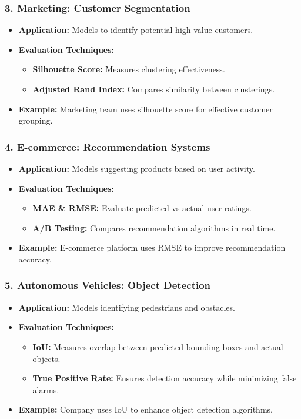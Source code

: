 \documentclass[aspectratio=169]{beamer}
\begin{document}
\begin{frame}[fragile]
    \frametitle{3. Marketing: Customer Segmentation}
    \begin{itemize}
        \item \textbf{Application:} Models to identify potential high-value customers.
        \item \textbf{Evaluation Techniques:}
        \begin{itemize}
            \item \textbf{Silhouette Score:} Measures clustering effectiveness.
            \item \textbf{Adjusted Rand Index:} Compares similarity between clusterings.
        \end{itemize}
        \item \textbf{Example:} Marketing team uses silhouette score for effective customer grouping.
    \end{itemize}
\end{frame}

\begin{frame}[fragile]
    \frametitle{4. E-commerce: Recommendation Systems}
    \begin{itemize}
        \item \textbf{Application:} Models suggesting products based on user activity.
        \item \textbf{Evaluation Techniques:}
        \begin{itemize}
            \item \textbf{MAE \& RMSE:} Evaluate predicted vs actual user ratings.
            \item \textbf{A/B Testing:} Compares recommendation algorithms in real time.
        \end{itemize}
        \item \textbf{Example:} E-commerce platform uses RMSE to improve recommendation accuracy.
    \end{itemize}
\end{frame}

\begin{frame}[fragile]
    \frametitle{5. Autonomous Vehicles: Object Detection}
    \begin{itemize}
        \item \textbf{Application:} Models identifying pedestrians and obstacles.
        \item \textbf{Evaluation Techniques:}
        \begin{itemize}
            \item \textbf{IoU:} Measures overlap between predicted bounding boxes and actual objects.
            \item \textbf{True Positive Rate:} Ensures detection accuracy while minimizing false alarms.
        \end{itemize}
        \item \textbf{Example:} Company uses IoU to enhance object detection algorithms.
    \end{itemize}
\end{frame}
\end{document}

